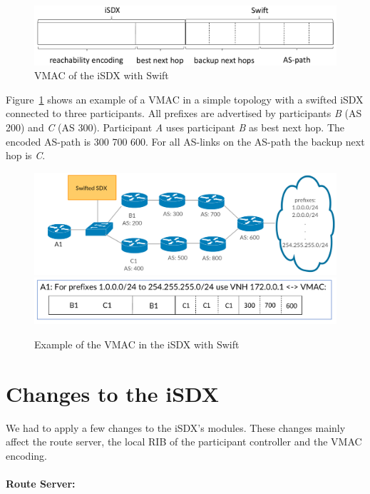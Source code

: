 \begin{figure}[h]
\center
\includegraphics[scale = 0.5]{Figures/design_vmac3_cropped.pdf}
\caption{VMAC of the iSDX with Swift}
\end{figure}

Figure~\ref{fig:sixdsvmac} shows an example of a VMAC in a simple topology with a swifted iSDX connected to three participants. All prefixes are advertised by participants \emph{B} (AS 200) and \emph{C} (AS 300). Participant \emph{A} uses participant \emph{B} as best next hop. The encoded AS-path is 300 700 600. For all AS-links on the AS-path the backup next hop is \emph{C}.

\begin{figure}[h]
\center
\includegraphics[scale = 0.24]{Figures/design_vmac_topology.pdf}
\includegraphics[scale = 0.35]{Figures/vmac_picture_cropped.pdf}
\caption{Example of the VMAC in the iSDX with Swift}
\label{fig:sixdsvmac}
\end{figure}

\section{\label{chapter4:Changes_to_the_iSDX}Changes to the iSDX}

We had to apply a few changes to the iSDX's modules. These changes mainly affect the route server, the local RIB of the participant controller and the VMAC encoding. 

\paragraph{\label{chapter4:Changes to the iSDX:route server}Route Server:}

